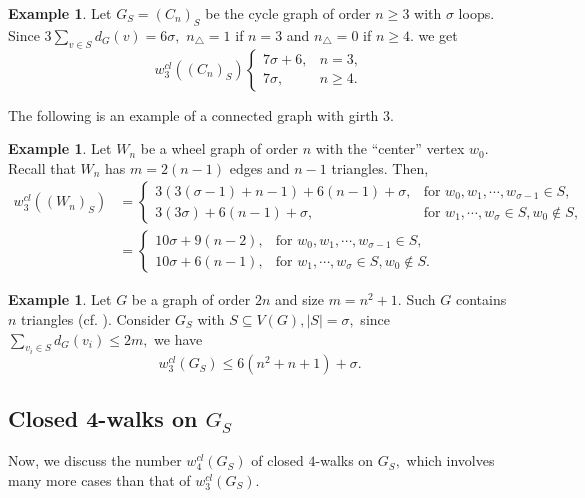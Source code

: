 \documentclass[12pt,a4paper,reqno]{amsart}
\numberwithin{equation}{section}
\theoremstyle{plain}
\theoremstyle{definition}
\newtheorem{example}[theorem]{Example}
\newcommand{\<}{\langle}
\renewcommand{\>}{\rangle}
\begin{document}
\begin{example}
Let $G_S=(C_n)_S$ be the cycle graph of order $n \geq 3$ with $\sigma$ loops. Since $3\sum_{v \in S} d_G(v) = 6\sigma,$ $n_\triangle=1$ if $n=3$ and $n_\triangle=0$ if $n\geq 4.$  we get 
\[
w_3^{cl}((C_n)_S)
\begin{cases}
7\sigma + 6, &n=3, \\
7\sigma, &n\geq 4.
\end{cases}
\]
\end{example}

The following is an example of a connected graph with girth 3. 

\begin{example}
Let $W_n$ be a wheel graph of order $n$ with the ``center'' vertex $w_0.$  Recall that $W_n$ has $m=2(n-1)$ edges and $n-1$ triangles. Then,
\begin{align*}
w_3^{cl}((W_n)_S)
&= 
\begin{cases}
3(3(\sigma-1)+n-1) +6(n-1)+\sigma, & \text{for }w_0,w_1,\cdots, w_{\sigma-1} \in S, \\
3(3\sigma) + 6(n-1) + \sigma, & \text{for }w_1, \cdots, w_\sigma \in S, w_0 \notin S,
\end{cases}\\
&= 
\begin{cases}
10\sigma + 9(n -2), & \text{for }w_0,w_1,\cdots, w_{\sigma-1} \in S, \\
10\sigma + 6(n-1), & \text{for }w_1, \cdots, w_\sigma \in S, w_0 \notin S. 
\end{cases}
\end{align*}
    
\end{example}

\begin{example}
Let $G$ be a graph of order $2n$ and size $m=n^2+1.$ Such $G$ contains $n$ triangles (cf. \cite[pp 19]{Harary1969}). Consider $G_S$ with $S\subseteq V(G), |S|=\sigma,$ since $\sum_{v_i \in S}d_G(v_i) \leq 2m,$ we have
\[
 w^{cl}_3(G_S) \leq 6(n^2 +n+1) + \sigma.
\]
\end{example}


\subsection{Closed 4-walks on $G_S$}

Now, we discuss the number $w_4^{cl}(G_S)$ of closed $4$-walks on $G_S,$ which involves many more cases than that of $w_3^{cl}(G_S).$ 
\end{document}
